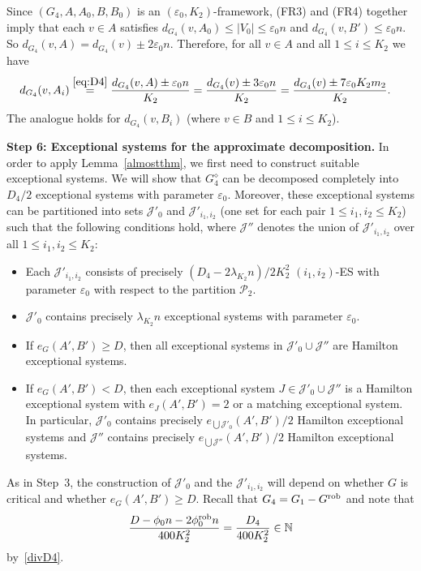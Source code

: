 \documentclass{memo-l}
\def\cP{\mathcal{P}}
\def\eps{\varepsilon}
\def\cJ{\mathcal{J}}
\numberwithin{section}{chapter}
\numberwithin{equation}{section}
\numberwithin{firstthm}{section}
\numberwithin{figure}{section}
\begin{document}
{Since $(G_4, A,A_0,B,B_0 )$ is an $(\eps_0, K_2)$-framework, (FR3) and (FR4) together imply that
each $v \in A$ satisfies $d_{G_4}(v, A_0) \le |V_0| \le \eps _ 0 n $ and $d_{G_4}(v, B') \le \eps _ 0 n $. So $d_{G_4}(v,A) = d_{G_4}(v) \pm 2 \eps_0 n  $.
Therefore, for all $v \in A$ and all $ 1 \le i \le K_2$ we have
\begin{align}
	d_{G_4}(v,A_i) &  \stackrel{\eqref{eq:D4}}{=} \frac{d_{G_4}(v,A) \pm \eps_0 n}{ K_2 }
	 = \frac{d_{G_4}(v) \pm 3 \eps_0 n}{ K_2 }
    = \frac{d_{G_4}(v) \pm 7\eps_0 K_2 m_2}{K_2}. %
 \label{eq:D2}
\end{align}
The analogue holds for $d_{G_4}(v,B_i)$ (where $v \in B$ and $ 1 \le i \le K_2$).


\smallskip

\noindent\textbf{Step 6: Exceptional systems for the approximate decomposition.}
In order to apply Lemma~\ref{almostthm}, we first need to construct suitable exceptional systems.
We will show that $G_4^{\diamond}$ can be decomposed completely into $D_4/2$ exceptional systems with parameter $\eps_0$.
Moreover, these exceptional systems can be partitioned into sets $\mathcal{J}'_0$ and $\mathcal{J}'_{i_1,i_2}$ (one set for each pair $1 \le i_1, i_2  \le K_2$)
such that the following conditions hold, where $\cJ''$ denotes the union of $\mathcal{J}'_{i_1, i_2}$ over all $1 \le i_1, i_2  \le K_2$: 
\begin{itemize}
	\item[($\gamma_1$)] Each $\mathcal{J}'_{i_1, i_2}$ consists of precisely $(D_4- 2 \lambda_{K_2} n)/2K^2_2$ $(i_1,i_2)$-ES with parameter $\eps _0$ with respect to the partition $\cP_2$.
	\item[($\gamma_2$)] $\mathcal{J}'_0$ contains precisely $\lambda_{K_2} n$ exceptional systems
	 with parameter $\eps _0$.
	\item[($\gamma_3$)] If $e_G(A',B') \ge D$, then all exceptional systems in $\mathcal{J}'_0 \cup \cJ''$ are Hamilton exceptional systems.
	\item[($\gamma_4$)] If $e_G(A',B') < D$, then each exceptional system $J \in \mathcal{J}'_0 \cup \cJ''$ is a Hamilton exceptional system
    with $e_J(A',B') = 2$ or a matching exceptional system.
	In particular, $\mathcal{J}'_0$  contains precisely
$e_{ \bigcup \mathcal{J}'_0 }(A',B')/2$ Hamilton exceptional systems and $\mathcal{J}''$  contains precisely
$e_{ \bigcup \mathcal{J}'' }(A',B')/2$ Hamilton exceptional systems.
\end{itemize}
As in Step~3, the construction of $\mathcal{J}'_0$ and the $\mathcal{J}'_{i_1,i_2}$ will depend on whether $G$ is critical and whether $e_G(A',B') \ge D$.
Recall that $G_4=G_1-G^{\rm rob}$ and note that
\begin{equation} \label{divD4b}
\frac{D- \phi_0n - 2 \phi^{\rm rob}_0 n}{400K^2_2}=\frac{D_4}{400K^2_2}\in \mathbb{N}
\end{equation}
by~\eqref{divD4}.

}
\end{document}

